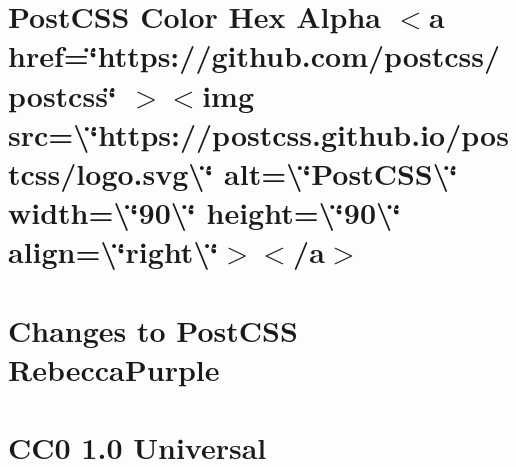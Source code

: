 \documentclass[twoside]{book}
\newcommand{\+}{\discretionary{\mbox{\scriptsize$\hookleftarrow$}}{}{}}
\begin{document}
\chapter{Post\+CSS Color Hex Alpha \texorpdfstring{$<$}{<}a href=\char`\"{}https\+://github.\+com/postcss/postcss\char`\"{} \texorpdfstring{$>$}{>}\texorpdfstring{$<$}{<}img src=\textbackslash{}\char`\"{}https\+://postcss.\+github.\+io/postcss/logo.\+svg\textbackslash{}\char`\"{} alt=\textbackslash{}\char`\"{}\+Post\+CSS\textbackslash{}\char`\"{} width=\textbackslash{}\char`\"{}90\textbackslash{}\char`\"{} height=\textbackslash{}\char`\"{}90\textbackslash{}\char`\"{} align=\textbackslash{}\char`\"{}right\textbackslash{}\char`\"{}\texorpdfstring{$>$}{>}\texorpdfstring{$<$}{<}/a\texorpdfstring{$>$}{>}}
\label{md__c___users_vaishnavi_jadhav__desktop__developer_code_mean_stack_example_client_node_modules_p680a69efc4f30d12cb9a17d376d0acd4}

\chapter{Changes to Post\+CSS Rebecca\+Purple}
\label{md__c___users_vaishnavi_jadhav__desktop__developer_code_mean_stack_example_client_node_modules_p258219fa64d4d1ed3b0d7e20fd9bea40}

\chapter{CC0 1.0 Universal}
\label{md__c___users_vaishnavi_jadhav__desktop__developer_code_mean_stack_example_client_node_modules_p159114e0c7e8ccce9cc798587c41a383}

\end{document}
